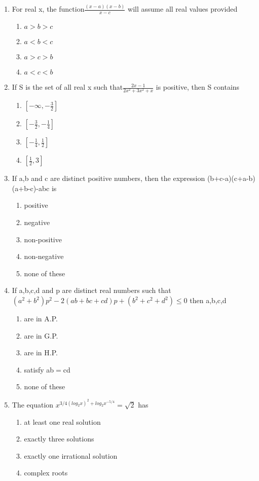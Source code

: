 \documentclass[journal,12pt,twocolumn]{IEEEtran}
\begin{document}
\begin{enumerate}[label=\arabic*]
\item For real x, the function$\frac{(x-a)(x-b)}{x-c}$ will assume all real values provided
\begin{enumerate}
\item $a>b>c$
\item $a<b<c$ 
\item $a>c>b$
\item $a<c<b$ 
\end{enumerate}

\item If S is the set of all real x such that$\frac{2x-1}{2x^{2}+3x^{2}+x}$ is positive, then S contains 
\begin{enumerate}
\item $[-\infty,-\frac{3}{2}]$
\item $[-\frac{3}{2},-\frac{1}{4}]$
\item $[-\frac{1}{4},\frac{1}{2}]$
\item $[\frac{1}{2},3]$
\end{enumerate}

\item If a,b and c are distinct positive numbers, then the expression (b+c-a)(c+a-b)(a+b-c)-abc is
\begin{enumerate}
\item positive
\item negative 
\item non-positive
\item non-negative
\item none of these 
\end{enumerate}

\item If a,b,c,d and p are distinct real numbers such that\\$(a^{2}+b^{2})p^{2}-2(ab+bc+cd)p+(b^{2}+c^{2}+d^{2})\leq0$ then a,b,c,d
\begin{enumerate}
\item are in A.P.
\item are in G.P. 
\item are in H.P.
\item satisfy ab$=$cd
\item none of these 
\end{enumerate}

\item The equation $x^{3/4(log_{2}x)^{2}+log_2x^{-5/4}}=\sqrt2$ has
\begin{enumerate}
\item at least one real solution
\item exactly three solutions
\item exactly one irrational solution
\item complex roots
\end{enumerate}


\end{enumerate}
\end{document}
